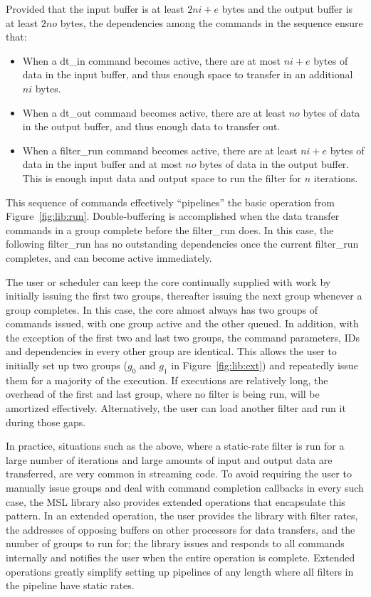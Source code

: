 Provided that the input buffer is at least $2ni+e$ bytes and the output buffer is at least $2no$ bytes, the dependencies among the commands in the sequence ensure that:
\begin{itemize}
\item When a \textsf{dt\_in} command becomes active, there are at most $ni+e$ bytes of data in the input buffer, and thus enough space to transfer in an additional $ni$ bytes.
\item When a \textsf{dt\_out} command becomes active, there are at least $no$ bytes of data in the output buffer, and thus enough data to transfer out.
\item When a \textsf{filter\_run} command becomes active, there are at least $ni+e$ bytes of data in the input buffer and at most $no$ bytes of data in the output buffer. This is enough input data and output space to run the filter for $n$ iterations.
\end{itemize}

This sequence of commands effectively ``pipelines'' the basic operation from Figure~\ref{fig:lib:run}. Double-buffering is accomplished when the data transfer commands in a group complete before the \textsf{filter\_run} does. In this case, the following \textsf{filter\_run} has no outstanding dependencies once the current \textsf{filter\_run} completes, and can become active immediately.

The user or scheduler can keep the core continually supplied with work
by initially issuing the first two groups, thereafter issuing the next
group whenever a group completes. In this case, the core almost always
has two groups of commands issued, with one group active and the other
queued. In addition, with the exception of the first two and last two
groups, the command parameters, IDs and dependencies in every other
group are identical. This allows the user to initially set up two
groups ($g_0$ and $g_1$ in Figure~\ref{fig:lib:ext}) and repeatedly
issue them for a majority of the execution. If executions are
relatively long, the overhead of the first and last group, where no
filter is being run, will be amortized effectively. Alternatively, the
user can load another filter and run it during those gaps.

In practice, situations such as the above, where a static-rate filter
is run for a large number of iterations and large amounts of input and
output data are transferred, are very common in streaming code. To
avoid requiring the user to manually issue groups and deal with
command completion callbacks in every such case, the MSL library also
provides extended operations that encapsulate this pattern. In an
extended operation, the user provides the library with filter rates,
the addresses of opposing buffers on other processors for data
transfers, and the number of groups to run for; the library issues and
responds to all commands internally and notifies the user when the
entire operation is complete.
Extended operations greatly simplify setting up pipelines
of any length where all filters in the pipeline have static rates.


